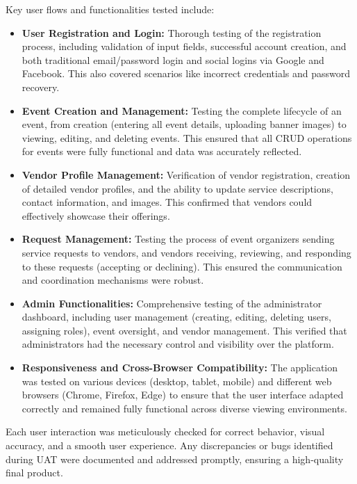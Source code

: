 \documentclass{report}
\begin{document}
Key user flows and functionalities tested include:
\begin{itemize}
    \item \textbf{User Registration and Login:} Thorough testing of the registration process, including validation of input fields, successful account creation, and both traditional email/password login and social logins via Google and Facebook. This also covered scenarios like incorrect credentials and password recovery.
    \item \textbf{Event Creation and Management:} Testing the complete lifecycle of an event, from creation (entering all event details, uploading banner images) to viewing, editing, and deleting events. This ensured that all CRUD operations for events were fully functional and data was accurately reflected.
    \item \textbf{Vendor Profile Management:} Verification of vendor registration, creation of detailed vendor profiles, and the ability to update service descriptions, contact information, and images. This confirmed that vendors could effectively showcase their offerings.
    \item \textbf{Request Management:} Testing the process of event organizers sending service requests to vendors, and vendors receiving, reviewing, and responding to these requests (accepting or declining). This ensured the communication and coordination mechanisms were robust.
    \item \textbf{Admin Functionalities:} Comprehensive testing of the administrator dashboard, including user management (creating, editing, deleting users, assigning roles), event oversight, and vendor management. This verified that administrators had the necessary control and visibility over the platform.
    \item \textbf{Responsiveness and Cross-Browser Compatibility:} The application was tested on various devices (desktop, tablet, mobile) and different web browsers (Chrome, Firefox, Edge) to ensure that the user interface adapted correctly and remained fully functional across diverse viewing environments.
\end{itemize}
Each user interaction was meticulously checked for correct behavior, visual accuracy, and a smooth user experience. Any discrepancies or bugs identified during UAT were documented and addressed promptly, ensuring a high-quality final product.
\end{document}
